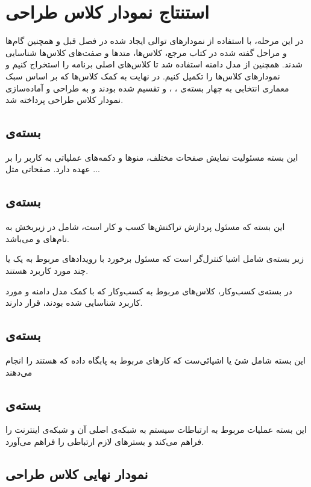 \chapter{استنتاج نمودار کلاس طراحی}
در این مرحله، با استفاده از نمودار‌های توالی ایجاد شده در فصل قبل و همچنین گام‌ها و مراحل گفته شده در کتاب مرجع، کلاس‌ها، متد‌ها و صفت‌های کلاس‌ها شناسایی شدند. همچنین از مدل دامنه استفاده شد تا کلاس‌های اصلی برنامه را استخراج کنیم و نمودار‌‌های کلاس‌ها را تکمیل کنیم. در نهایت به کمک کلاس‌ها که بر اساس سبک معماری انتخابی به چهار بسته‌ی 
،
،
 و 
تقسیم شده بودند و به طراحی و آماده‌سازی نمودار کلاس طراحی پرداخته شد.

\section{بسته‌ی \frontend}
این بسته مسئولیت نمایش صفحات مختلف، منو‌ها و دکمه‌های عملیاتی به کاربر را بر عهده دارد. صفحاتی مثل ...

\section{بسته‌ی }
این بسته که مسئول پردازش تراکنش‌ها کسب و کار است، شامل در زیربخش به نام‌های   و  می‌باشد.

زیر بسته‌ی  شامل اشیا کنترل‌گر است که مسئول برخورد با رویداد‌های مربوط به یک یا چند مورد کاربرد هستند. 

در بسته‌ی کسب‌وکار،‌ کلاس‌های مربوط به کسب‌وکار که با کمک مدل دامنه و مورد کاربرد شناسایی شده بودند، قرار دارند.
\section{بسته‌ی }
این بسته شامل شئ یا اشیا‌‌ئی‌ست که کار‌های مربوط به پابگاه داده که  هستند را انجام می‌دهند 
\section{بسته‌ی }
این بسته عملیات مربوط به ارتباطات سیستم به شبکه‌ی اصلی آن و شبکه‌ی اینترنت را فراهم می‌کند و بستر‌های لازم ارتباطی را فراهم می‌آورد.
\section{نمودار نهایی کلاس طراحی}

